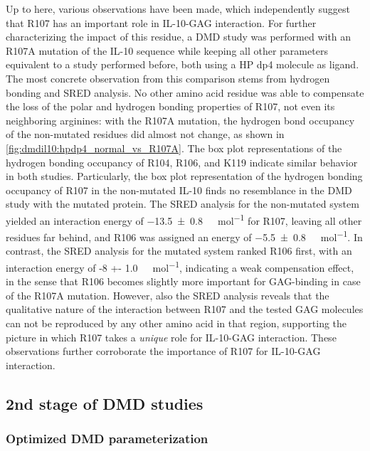 Up to here, various observations have been made, which independently suggest
that R107 has an important role in IL-10-GAG interaction. For further
characterizing the impact of this residue, a DMD study was performed with an
R107A mutation of the IL-10 sequence while keeping all other parameters
equivalent to a study performed before, both using a HP dp4 molecule as ligand.
The most concrete observation from this comparison stems from hydrogen bonding
and SRED analysis. No other amino acid residue was able to compensate the loss
of the polar and hydrogen bonding properties of R107, not even its neighboring
arginines: with the R107A mutation, the hydrogen bond occupancy of the
non-mutated residues did almost not change, as shown in
\cref{fig:dmdil10:hpdp4_normal_vs_R107A}. The box plot representations of the
hydrogen bonding occupancy of R104, R106, and K119 indicate similar behavior in
both studies. Particularly, the box plot representation of the hydrogen bonding
occupancy of R107 in the non-mutated IL-10 finds no resemblance in the DMD study
with the mutated protein. The SRED analysis for the non-mutated system yielded
an interaction energy of \SI{-13.5 +- 0.8}{\kilo\calory\per\mol} for R107,
leaving all other residues far behind, and R106 was assigned an energy of
\SI{-5.5 +- 0.8}{\kilo\calory\per\mol}. In contrast, the SRED analysis for the
mutated system ranked R106 first, with an interaction energy of \SI{-8 +-
1.0}{\kilo\calory\per\mol}, indicating a weak compensation effect, in the sense
that R106 becomes slightly more important for GAG-binding in case of the R107A
mutation. However, also the SRED analysis reveals that the qualitative nature of
the interaction between R107 and the tested GAG molecules can not be reproduced
by any other amino acid in that region, supporting the picture in which R107
takes a \textit{unique} role for IL-10-GAG interaction. These observations
further corroborate the importance of R107 for IL-10-GAG interaction.


\subsection{2nd stage of DMD studies}


\subsubsection{Optimized DMD parameterization}
\label{dmdil10:method_setup_2nd}

